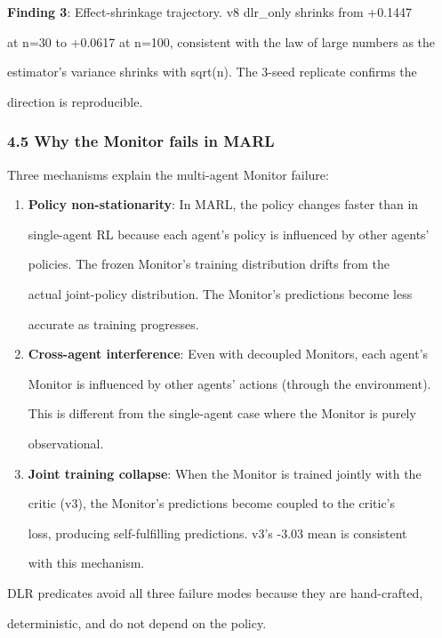 \documentclass[
]{article}
\begin{document}
\textbf{Finding 3}: Effect-shrinkage trajectory. v8 dlr\_only shrinks
from +0.1447

at n=30 to +0.0617 at n=100, consistent with the law of large numbers as
the

estimator's variance shrinks with sqrt(n). The 3-seed replicate confirms
the

direction is reproducible.

\subsubsection{4.5 Why the Monitor fails in
MARL}\label{why-the-monitor-fails-in-marl}

Three mechanisms explain the multi-agent Monitor failure:

\begin{enumerate}
\def\labelenumi{\arabic{enumi}.}
\item
  \textbf{Policy non-stationarity}: In MARL, the policy changes faster
  than in

  single-agent RL because each agent's policy is influenced by other
  agents'

  policies. The frozen Monitor's training distribution drifts from the

  actual joint-policy distribution. The Monitor's predictions become
  less

  accurate as training progresses.
\item
  \textbf{Cross-agent interference}: Even with decoupled Monitors, each
  agent's

  Monitor is influenced by other agents' actions (through the
  environment).

  This is different from the single-agent case where the Monitor is
  purely

  observational.
\item
  \textbf{Joint training collapse}: When the Monitor is trained jointly
  with the

  critic (v3), the Monitor's predictions become coupled to the critic's

  loss, producing self-fulfilling predictions. v3's -3.03 mean is
  consistent

  with this mechanism.
\end{enumerate}

DLR predicates avoid all three failure modes because they are
hand-crafted,

deterministic, and do not depend on the policy.
\end{document}
